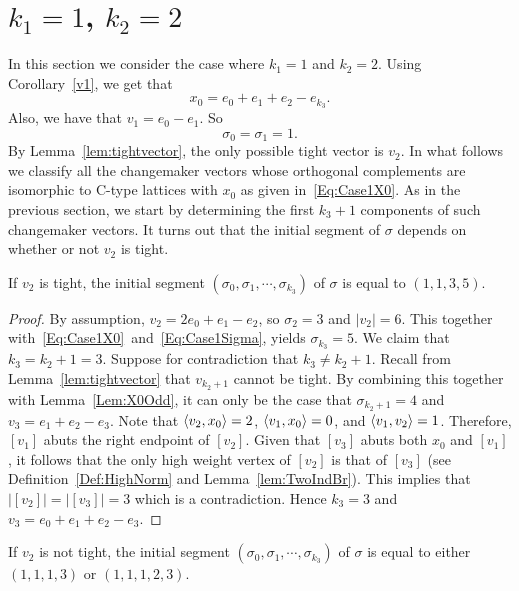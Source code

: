 \section{{\bf $k_1 = 1$, $k_2 = 2$}}\label{sec:k1k21}

In this section we consider the case where $k_1=1$ and $k_2=2$. Using Corollary~\ref{v1}, we get that
\begin{equation}\label{Eq:Case1X0}
x_0=e_0 + e_1 + e_{2} - e_{k_3}. 
\end{equation}
Also, we have that $v_1 = e_0 - e_1$. So 
\begin{equation}\label{Eq:Case1Sigma}
\sigma_0 = \sigma_1 = 1.
\end{equation} 
By Lemma~\ref{lem:tightvector}, the only possible tight vector is $v_2$.
In what follows we classify all the changemaker vectors whose orthogonal complements are isomorphic to C-type lattices with $x_0$ as given in~\eqref{Eq:Case1X0}. As in the previous section, we start by determining the first $k_3+1$ components of such changemaker vectors. It turns out that the initial segment of $\sigma$ depends on whether or not $v_2$ is tight. 

\begin{lemma}\label{prop1}
If $v_2$ is tight, the initial segment $(\sigma_0,\sigma_1,\cdots,\sigma_{k_3})$ of $\sigma$ is equal to $(1, 1, 3, 5)$.
\end{lemma}
\begin{proof}
By assumption, $v_2 = 2e_0 + e_1 - e_2$, so $\sigma_2 = 3$ and $|v_2| = 6$. This together with~\eqref{Eq:Case1X0}~and~\eqref{Eq:Case1Sigma}, yields $\sigma_{k_3} = 5$. We claim that $k_3 = k_2+1 = 3$. Suppose for contradiction that $k_3 \not = k_2 + 1$. Recall from Lemma~\ref{lem:tightvector} that $v_{k_2+1}$ cannot be tight. By combining this together with Lemma~\ref{Lem:X0Odd}, it can only be the case that $\sigma_{k_2+1}=4$ and $v_3 = e_1+e_2-e_3$. Note that $\left\langle v_2 , x_0 \right\rangle=2$, $\left\langle v_1 , x_0 \right\rangle=0$, and $\left\langle v_1 , v_2 \right\rangle=1$. Therefore, $[v_1]$ abuts the right endpoint of $[v_2]$. Given that $[v_3]$ abuts both $x_0$ and $[v_1]$, it follows that the only high weight vertex of $[v_2]$ is that of $[v_3]$ (see Definition~\ref{Def:HighNorm} and Lemma~\ref{lem:TwoIndBr}). This implies that $|[v_2]|=|[v_3]|=3$ which is a contradiction. Hence $k_3 = 3$ and $v_3 = e_0+e_1+e_2 - e_3$. 
\end{proof}

\begin{lemma}\label{prop2}
If $v_2$ is not tight, the initial segment $(\sigma_0,\sigma_1,\cdots,\sigma_{k_3})$ of $\sigma$ is equal to either $(1, 1, 1, 3)$ or $(1, 1, 1, 2, 3)$.
\end{lemma}

